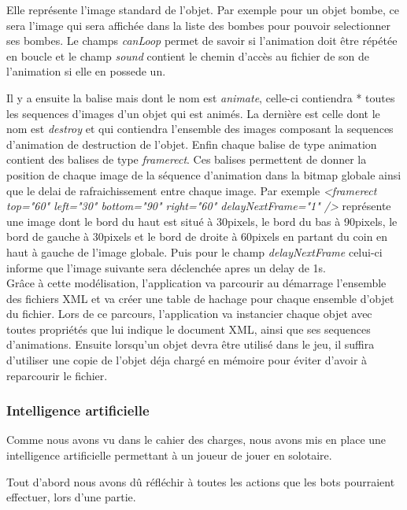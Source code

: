 			Elle représente l'image standard de l'objet.
			Par exemple pour un objet bombe, ce sera l'image qui sera affichée dans la liste des bombes 
			pour pouvoir selectionner ses bombes.
			Le champs \textit{canLoop} permet de savoir si l'animation doit être répétée en boucle 
			et le champ \textit{sound} contient le chemin d'accès au fichier de son de l'animation 
			si elle en possede un.
			
			Il y a ensuite la balise mais dont le nom est \textit{animate}, celle-ci contiendra *
			toutes les sequences d'images d'un objet qui est animés.
			La dernière est celle dont le nom est \textit{destroy} et qui contiendra 
			l'ensemble des images composant la sequences d'animation de destruction de l'objet.
			Enfin chaque balise de type animation contient des balises de type \textit{framerect}.
			Ces balises permettent de donner la position de chaque image de la séquence d'animation
			dans la bitmap globale ainsi que le delai de rafraichissement entre chaque image.
			Par exemple \textit{<framerect top="60" left="30" bottom="90" right="60" delayNextFrame="1" />}
			représente une image dont le bord du haut est situé à 30pixels, le bord du bas à 90pixels, 
			le bord de gauche à 30pixels et le bord de droite à 60pixels en partant du coin en haut à 
			gauche de l'image globale.
			Puis pour le champ \textit{delayNextFrame} celui-ci informe que l'image suivante sera déclenchée 
			apres un delay de 1s.\\
		
			Grâce à cette modélisation, l'application va parcourir au démarrage l'ensemble des fichiers 
			XML et va créer une table de hachage pour chaque ensemble d'objet du fichier.
			Lors de ce parcours, l'application va instancier chaque objet avec toutes propriétés 
			que lui indique le document XML, ainsi que ses sequences d'animations.
			Ensuite lorsqu'un objet devra être utilisé dans le jeu, il suffira d'utiliser 
			une copie de l'objet déja chargé en mémoire pour éviter d'avoir à reparcourir le fichier.
			
			
	\subsubsection{Intelligence artificielle}
	
		Comme nous avons vu dans le cahier des charges, nous avons mis en 
		place une intelligence artificielle permettant à un joueur de jouer 
		en solotaire.
	
		Tout d'abord nous avons dû réfléchir à toutes les actions que les 
		\glspl{bot} pourraient effectuer, lors d'une partie.
		

